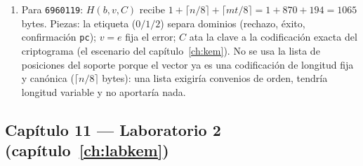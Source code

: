 \begin{enumerate}[leftmargin=1.9em,itemsep=4pt]
        esa asimetría es justo la que quiere un KEM: el lado sin
        clave (cifrar) por el camino barato y paralelo, y el lado
        con la clave (descifrar) pagando el álgebra fuerte.
  \item Para \texttt{6960119}: $H(b,v,C)$ recibe $1+\lceil
        n/8\rceil+\lceil mt/8\rceil=1+870+194=1065$ bytes. Piezas:
        la etiqueta ($0/1/2$) separa dominios (rechazo, éxito,
        confirmación \texttt{pc}); $v=e$ fija el error; $C$ ata la
        clave a la codificación exacta del criptograma (el escenario
        del capítulo~\ref{ch:kem}). No se usa la lista de posiciones
        del soporte porque el vector ya es una codificación de
        longitud fija y canónica ($\lceil n/8\rceil$ bytes): una
        lista exigiría convenios de orden, tendría longitud variable
        y no aportaría nada.
\end{enumerate}

\subsection*{Capítulo 11 --- Laboratorio 2
(capítulo~\ref{ch:labkem})}

